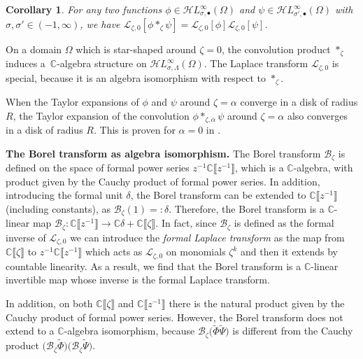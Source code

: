 \documentclass[pdftex]{sigma}
\newcommand{\singexp}[2]{\mathcal{H}L^\infty_{#1, #2}}
\newcommand{\singexpalg}[1]{\singexp{#1}{\bullet}}
\newcommand{\maps}{\colon}
\newcommand{\C}{\mathbb{C}}
\newcommand{\series}[1]{\tilde{#1}}
\newcommand{\laplace}{\mathcal{L}}
\newcommand{\borel}{\mathcal{B}}
\numberwithin{equation}{section}
\newtheorem{Corollary}[Theorem]{Corollary}
\begin{document}
\begin{Corollary}\label{prop:convolution_iso_laplace}
For any two functions $\phi \in \singexpalg{\sigma}(\Omega)$ and $\psi \in \singexpalg{\sigma'}(\Omega)$ with $\sigma, \sigma' \in (-1, \infty)$, we have
$%
\laplace_{\zeta,0}[\phi\ast_{\zeta}\psi]=\laplace_{\zeta,0}[\phi] \laplace_{\zeta,0}[\psi]$.
\end{Corollary}

On a domain $\Omega$ which is star-shaped around $\zeta = 0$, the convolution product $\ast_{\zeta}$ induces a~$\C$-algebra structure on $\singexp{\sigma}{\Lambda}(\Omega)$. The Laplace transform $\laplace_{\zeta, 0}$ is special, because it is an algebra isomorphism with respect to $\ast_{\zeta}$.
\begin{Remark}
When the Taylor expansions of $\phi$ and $\psi$ around $\zeta=\alpha$ converge in a disk of radius $R$, the Taylor expansion of the convolution $\phi\ast_{\zeta,\alpha}\psi$ around $\zeta=\alpha$ also converges in a disk of radius $R$. This is proven for $\alpha = 0$ in \cite[Lemma~5.14]{diverg-resurg-i}.
\end{Remark}

{\bf The Borel transform as algebra isomorphism.}
The Borel transform $\borel_\zeta$ is defined on the space of formal power series $z^{-1}\C\big\llbracket z^{-1}\big\rrbracket$, which is a $\C$-algebra, with product given by the Cauchy product of formal power series. In addition, introducing the formal unit $\delta$, the Borel transform can be extended to $\C\big\llbracket z^{-1}\big\rrbracket$ (including constants), as $\borel_\zeta(1)=:\delta$. Therefore, the Borel transform is a $\C$-linear map
$\borel_\zeta\maps\C\big\llbracket z^{-1}\big\rrbracket\to\C\delta + \C\llbracket\zeta\rrbracket$.
In fact, since $\borel_\zeta$ is defined as the formal inverse of $\laplace_{\zeta,0}$ we can introduce the \textit{formal Laplace transform} as the map from $\C\llbracket \zeta\rrbracket$ to $z^{-1}\C\big\llbracket z^{-1}\big\rrbracket$ which acts as $\laplace_{\zeta,0}$ on monomials $\zeta^k$ and then it extends by countable linearity. As a result, we find that the Borel transform is a $\C$-linear invertible map whose inverse is the formal Laplace transform.

In addition, on both $\C\llbracket\zeta\rrbracket$ and $\C\big\llbracket z^{-1}\big\rrbracket$ there is the natural product given by the Cauchy product of formal power series. However, the Borel transform does not extend to a $\C$-algebra isomorphism, because $\borel_\zeta\bigl(\series{\Phi}\series{\Psi}\bigr)$ is different from the Cauchy product $\bigl(\borel_\zeta \series{\Phi}\bigr)\bigl(\borel_\zeta \series{\Psi}\bigr)$.
\end{document}

